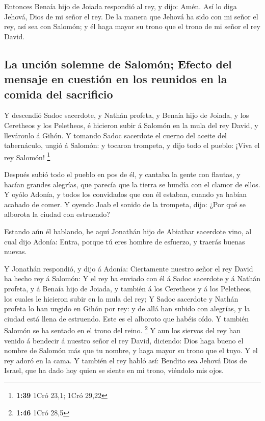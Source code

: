 Entonces Benaía hijo de Joiada respondió al rey, y dijo:
Amén. Así lo diga Jehová, Dios de mi señor el rey.  De la
manera que Jehová ha sido con mi señor el rey, así sea con Salomón; y él
haga mayor su trono que el trono de mi señor el rey David.

\hypertarget{la-unciuxf3n-solemne-de-salomuxf3n-efecto-del-mensaje-en-cuestiuxf3n-en-los-reunidos-en-la-comida-del-sacrificio}{%
\subsection{La unción solemne de Salomón; Efecto del mensaje en cuestión
en los reunidos en la comida del
sacrificio}\label{la-unciuxf3n-solemne-de-salomuxf3n-efecto-del-mensaje-en-cuestiuxf3n-en-los-reunidos-en-la-comida-del-sacrificio}}

 Y descendió Sadoc sacerdote, y Nathán profeta, y Benaía
hijo de Joiada, y los Ceretheos y los Peletheos, é hicieron subir á
Salomón en la mula del rey David, y lleváronlo á Gihón. 
Y tomando Sadoc sacerdote el cuerno del aceite del tabernáculo, ungió á
Salomón: y tocaron trompeta, y dijo todo el pueblo: ¡Viva el rey
Salomón! \footnote{\textbf{1:39} 1Cró 23,1; 1Cró 29,22}

 Después subió todo el pueblo en pos de él, y cantaba la
gente con flautas, y hacían grandes alegrías, que parecía que la tierra
se hundía con el clamor de ellos.  Y oyólo Adonía, y
todos los convidados que con él estaban, cuando ya habían acabado de
comer. Y oyendo Joab el sonido de la trompeta, dijo: ¿Por qué se
alborota la ciudad con estruendo?

 Estando aún él hablando, he aquí Jonathán hijo de
Abiathar sacerdote vino, al cual dijo Adonía: Entra, porque tú eres
hombre de esfuerzo, y traerás buenas nuevas.

 Y Jonathán respondió, y dijo á Adonía: Ciertamente
nuestro señor el rey David ha hecho rey á Salomón:  Y el
rey ha enviado con él á Sadoc sacerdote y á Nathán profeta, y á Benaía
hijo de Joiada, y también á los Ceretheos y á los Peletheos, los cuales
le hicieron subir en la mula del rey;  Y Sadoc sacerdote
y Nathán profeta lo han ungido en Gihón por rey: y de allá han subido
con alegrías, y la ciudad está llena de estruendo. Este es el alboroto
que habéis oído.  Y también Salomón se ha sentado en el
trono del reino. \footnote{\textbf{1:46} 1Cró 28,5}  Y
aun los siervos del rey han venido á bendecir á nuestro señor el rey
David, diciendo: Dios haga bueno el nombre de Salomón más que tu nombre,
y haga mayor su trono que el tuyo. Y el rey adoró en la cama.
 Y también el rey habló así: Bendito sea Jehová Dios de
Israel, que ha dado hoy quien se siente en mi trono, viéndolo mis ojos.

